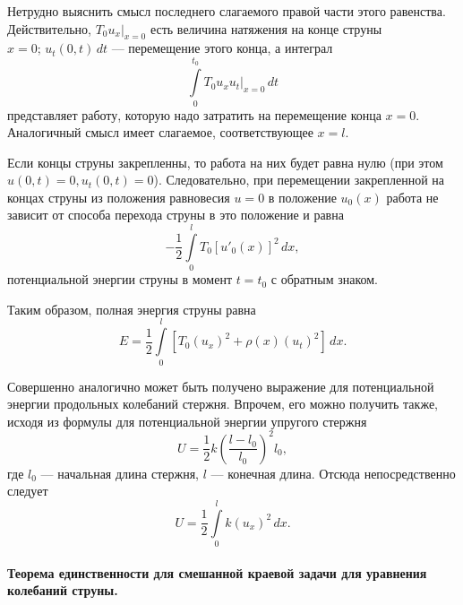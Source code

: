 Нетрудно выяснить смысл последнего слагаемого правой части этого равенства. Действительно, $T_0 u_x|_{x = 0}$ есть величина натяжения на конце струны $x = 0; \, u_t(0, t) \, dt$  --- перемещение этого конца, а интеграл 
\begin{equation}
	\int \limits_{0}^{t_0} T_0 u_x u_t|_{x = 0} \, dt
\end{equation}
представляет работу, которую надо затратить на перемещение конца $x = 0$. Аналогичный смысл имеет слагаемое, соответствующее $x = l$. 

Если концы струны закрепленны, то работа на них будет равна нулю (при этом $u(0, t) = 0, u_t(0, t) = 0$). Следовательно, при перемещении закрепленной на концах струны из положения равновесия $u = 0$ в положение $u_0(x)$ работа не зависит от способа перехода струны в это положение и равна 
\begin{equation}
	-\frac{1}{2} \int \limits_{0}^{l} T_0[u'_0(x)]^2 \, dx, 
\end{equation}
потенциальной энергии струны в момент $t = t_0$ с обратным знаком.

Таким образом, полная энергия струны равна
\begin{equation}
	E = \frac{1}{2} \int \limits_{0}^{l} [T_0(u_x)^2 + \rho(x)(u_t)^2] \, dx.
\end{equation}

Совершенно аналогично может быть получено выражение для потенциальной энергии продольных колебаний стержня. Впрочем, его можно получить также, исходя из формулы для потенциальной энергии упругого стержня
\begin{equation*}
	U = \frac{1}{2} k(\frac{l - l_0}{l_0})^2 l_0,
\end{equation*}
где $l_0$ --- начальная длина стержня, $l$ --- конечная длина. Отсюда непосредственно следует 
\begin{equation*}
	U = \frac{1}{2} \int \limits_{0}^{l} k(u_x)^2 \, dx.
\end{equation*}

\paragraph{Теорема единственности для смешанной краевой задачи для уравнения колебаний струны.}

